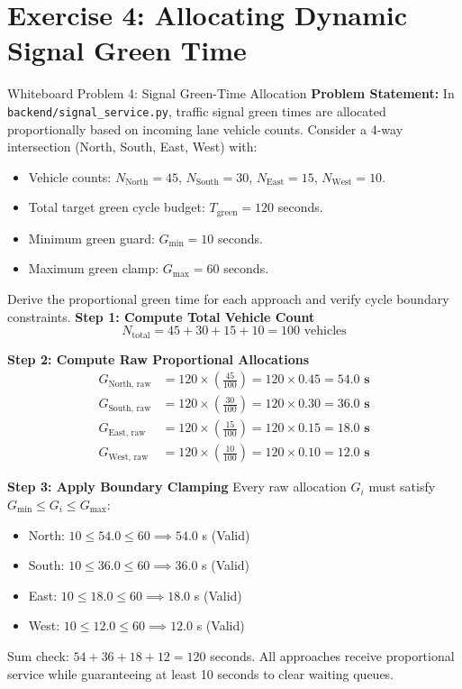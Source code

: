 \section{Exercise 4: Allocating Dynamic Signal Green Time}
\label{sec:wb_signal}

\begin{interviewq}{Whiteboard Problem 4: Signal Green-Time Allocation}
\textbf{Problem Statement:}
In \texttt{backend/signal\_service.py}, traffic signal green times are allocated proportionally based on incoming lane vehicle counts. Consider a 4-way intersection (North, South, East, West) with:
\begin{itemize}
    \item Vehicle counts: $N_{\text{North}} = 45$, $N_{\text{South}} = 30$, $N_{\text{East}} = 15$, $N_{\text{West}} = 10$.
    \item Total target green cycle budget: $T_{\text{green}} = 120$ seconds.
    \item Minimum green guard: $G_{\min} = 10$ seconds.
    \item Maximum green clamp: $G_{\max} = 60$ seconds.
\end{itemize}
Derive the proportional green time for each approach and verify cycle boundary constraints.
\tcblower
\textbf{Step 1: Compute Total Vehicle Count}
\begin{equation*}
N_{\text{total}} = 45 + 30 + 15 + 10 = 100 \text{ vehicles}
\end{equation*}

\textbf{Step 2: Compute Raw Proportional Allocations}
\begin{align*}
G_{\text{North, raw}} &= 120 \times \left(\frac{45}{100}\right) = 120 \times 0.45 = \mathbf{54.0 \text{ s}} \\
G_{\text{South, raw}} &= 120 \times \left(\frac{30}{100}\right) = 120 \times 0.30 = \mathbf{36.0 \text{ s}} \\
G_{\text{East, raw}}  &= 120 \times \left(\frac{15}{100}\right) = 120 \times 0.15 = \mathbf{18.0 \text{ s}} \\
G_{\text{West, raw}}  &= 120 \times \left(\frac{10}{100}\right) = 120 \times 0.10 = \mathbf{12.0 \text{ s}}
\end{align*}

\textbf{Step 3: Apply Boundary Clamping}
Every raw allocation $G_i$ must satisfy $G_{\min} \le G_i \le G_{\max}$:
\begin{itemize}
    \item North: $10 \le 54.0 \le 60 \implies 54.0$ s (Valid)
    \item South: $10 \le 36.0 \le 60 \implies 36.0$ s (Valid)
    \item East: $10 \le 18.0 \le 60 \implies 18.0$ s (Valid)
    \item West: $10 \le 12.0 \le 60 \implies 12.0$ s (Valid)
\end{itemize}
Sum check: $54 + 36 + 18 + 12 = 120$ seconds. All approaches receive proportional service while guaranteeing at least 10 seconds to clear waiting queues.
\end{interviewq}

